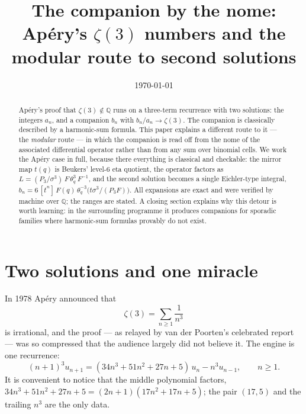 \documentclass[11pt,reqno]{amsart}
\theoremstyle{plain}
\theoremstyle{definition}
\theoremstyle{remark}
\newcommand{\Q}{\mathbb{Q}}
\newcommand{\tq}{\theta_q}
\numberwithin{equation}{section}
\begin{document}
\title[The companion by the nome]
      {The companion by the nome:\\
       Ap\'ery's $\zeta(3)$ numbers and the\\ modular route to second solutions}

\author{}
\date{\today}


\begin{abstract}
Ap\'ery's proof that $\zeta(3)\notin\Q$ runs on a three-term recurrence with
two solutions: the integers $a_n$, and a companion $b_n$ with
$b_n/a_n\to\zeta(3)$. The companion is classically described by a harmonic-sum
formula. This paper explains a different route to it --- the \emph{modular}
route --- in which the companion is read off from the nome of the associated
differential operator rather than from any sum over binomial cells. We work the
Ap\'ery case in full, because there everything is classical and checkable: the
mirror map $t(q)$ is Beukers' level-$6$ eta quotient, the operator factors as
$L=(P_3/\sigma^3)\,F\,\tq^3\,F^{-1}$, and the second solution becomes a single
Eichler-type integral,
$b_n=6\,[t^n]\,F(q)\,\tq^{-3}\bigl(t\sigma^3/(P_3F)\bigr)$.
All expansions are exact and were verified by machine over $\Q$; the ranges are
stated. A closing section explains why this detour is worth learning: in the
surrounding programme it produces companions for sporadic families where
harmonic-sum formulas provably do not exist.
\end{abstract}

\maketitle

\section{Two solutions and one miracle}

In 1978 Ap\'ery announced that
\[
  \zeta(3)=\sum_{n\ge1}\frac{1}{n^3}
\]
is irrational, and the proof --- as relayed by van der Poorten's celebrated
report \cite{vdP} --- was so compressed that the audience largely did not
believe it. The engine is one recurrence:
\begin{equation}\label{eq:rec}
  (n+1)^3u_{n+1}=(34n^3+51n^2+27n+5)\,u_n-n^3u_{n-1},
  \qquad n\ge1 .
\end{equation}
It is convenient to notice that the middle polynomial factors,
$34n^3+51n^2+27n+5=(2n+1)(17n^2+17n+5)$; the pair $(17,5)$ and the trailing
$n^3$ are the only data.
\end{document}
